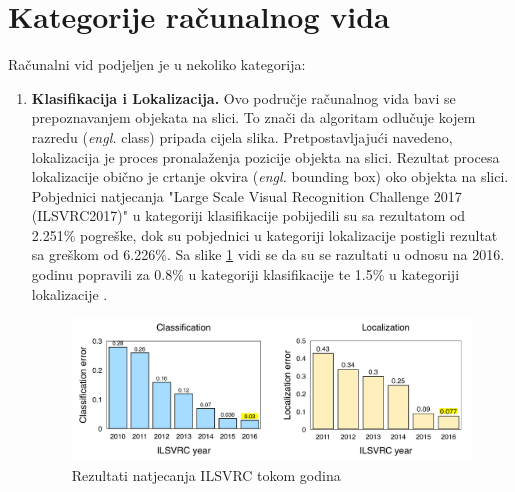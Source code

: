 \section{Kategorije računalnog vida}
Računalni vid podjeljen je u nekoliko kategorija:
\begin{enumerate}
\item \textbf{Klasifikacija i Lokalizacija.} Ovo područje računalnog vida bavi se prepoznavanjem objekata na slici. To znači da algoritam odlučuje kojem razredu (\textit{engl.} class) pripada cijela slika. Pretpostavljajući navedeno, lokalizacija je proces pronalaženja pozicije objekta na slici. Rezultat procesa lokalizacije obično je crtanje okvira (\textit{engl.} bounding box) oko objekta na slici. Pobjednici natjecanja "Large Scale Visual Recognition Challenge 2017 (ILSVRC2017)" u kategoriji klasifikacije pobijedili su sa rezultatom od 2.251\% pogreške, dok su pobjednici u kategoriji lokalizacije postigli rezultat sa greškom od 6.226\%. Sa slike \ref{img:ILSVRC} vidi se da su se razultati u odnosu na 2016. godinu popravili za 0.8\% u kategoriji klasifikacije te 1.5\% u kategoriji lokalizacije .
\begin{figure}[htb]
\centering
\includegraphics[width=\linewidth]{img/ILSVRC.png}
\caption{Rezultati natjecanja ILSVRC tokom godina \citep{ILSVRC}}
\label{img:ILSVRC}
\end{figure}


\end{enumerate}
